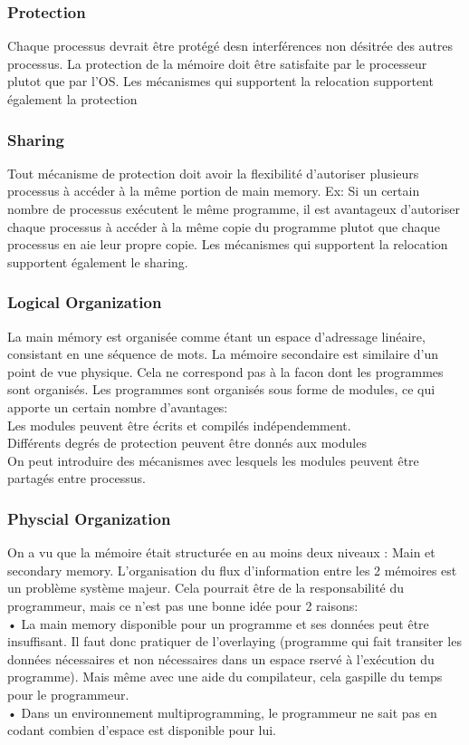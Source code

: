 \subsubsection{Protection}
Chaque processus devrait être protégé desn interférences non désitrée des autres processus. La protection de la mémoire doit être satisfaite par le processeur plutot que par l'OS. Les mécanismes qui supportent la relocation supportent également la protection
\subsubsection{Sharing}
Tout mécanisme de protection doit avoir la flexibilité d'autoriser plusieurs processus à accéder à la même portion de main memory. Ex: Si un certain nombre de processus exécutent le même programme, il est avantageux d'autoriser chaque processus à accéder à la même copie du programme plutot que chaque processus en aie leur propre copie. Les mécanismes qui supportent la relocation supportent également le sharing.
\subsubsection{Logical Organization}
La main mémory est organisée comme étant un espace d'adressage linéaire, consistant en une séquence de mots. La mémoire secondaire est similaire d'un point de vue physique. Cela ne correspond pas à la facon dont les programmes sont organisés. Les programmes sont organisés sous forme de modules, ce qui apporte un certain nombre d'avantages: \\
Les modules peuvent être écrits et compilés indépendemment.  \\
Différents degrés de protection peuvent être donnés aux modules \\
On peut introduire des mécanismes avec lesquels les modules peuvent être partagés entre processus.
\subsubsection{Physcial Organization}
On a vu que la mémoire était structurée en au moins deux niveaux : Main et secondary memory. L'organisation du flux d'information entre les 2 mémoires est un problème système majeur. Cela pourrait être de la responsabilité du programmeur, mais ce n'est pas une bonne idée pour 2 raisons: \\
• La main memory disponible pour un programme et ses données peut être insuffisant. Il faut donc pratiquer de l'overlaying (programme qui fait transiter les données nécessaires et non nécessaires dans un espace rservé à l'exécution du programme). Mais même avec une aide du compilateur, cela gaspille du temps pour le programmeur. \\
• Dans un environnement multiprogramming, le programmeur ne sait pas en codant combien d'espace est disponible pour lui.
